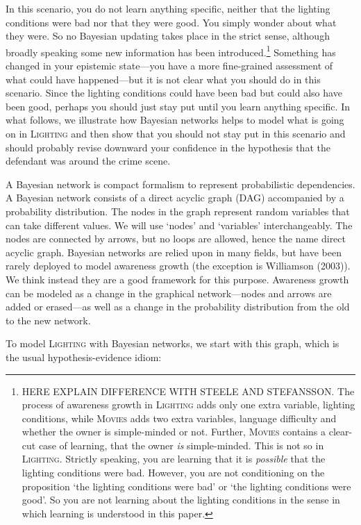 \documentclass[
  11pt,
  dvipsnames,enabledeprecatedfontcommands]{scrartcl}
\begin{document}
In this scenario, you do not learn anything specific, neither that the
lighting conditions were bad nor that they were good. You simply wonder
about what they were. So no Bayesian updating takes place in the strict
sense, although broadly speaking some new information has been
introduced.\footnote{HERE EXPLAIN DIFFERENCE WITH STEELE AND STEFANSSON.
  The process of awareness growth in \textsc{Lighting} adds only one
  extra variable, lighting conditions, while \textsc{Movies} adds two
  extra variables, language difficulty and whether the owner is
  simple-minded or not. Further, \textsc{Movies} contains a clear-cut
  case of learning, that the owner \emph{is} simple-minded. This is not
  so in \textsc{Lighting}. Strictly speaking, you are learning that it
  is \emph{possible} that the lighting conditions were bad. However, you
  are not conditioning on the proposition `the lighting conditions were
  bad' or `the lighting conditions were good'. So you are not learning
  about the lighting conditions in the sense in which learning is
  understood in this paper.} Something has changed in your epistemic
state---you have a more fine-grained assessment of what could have
happened---but it is not clear what you should do in this scenario.
Since the lighting conditions could have been bad but could also have
been good, perhaps you should just stay put until you learn anything
specific. In what follows, we illustrate how Bayesian networks helps to
model what is going on in \textsc{Lighting} and then show that you
should not stay put in this scenario and should probably revise downward
your confidence in the hypothesis that the defendant was around the
crime scene.

A Bayesian network is compact formalism to represent probabilistic
dependencies. A Bayesian network consists of a direct acyclic graph
(DAG) accompanied by a probability distribution. The nodes in the graph
represent random variables that can take different values. We will use
`nodes' and `variables' interchangeably. The nodes are connected by
arrows, but no loops are allowed, hence the name direct acyclic graph.
Bayesian networks are relied upon in many fields, but have been rarely
deployed to model awareness growth (the exception is Williamson (2003)).
We think instead they are a good framework for this purpose. Awareness
growth can be modeled as a change in the graphical network---nodes and
arrows are added or erased---as well as a change in the probability
distribution from the old to the new network.

To model \textsc{Lighting} with Bayesian networks, we start with this
graph, which is the usual hypothesis-evidence idiom:
\end{document}
